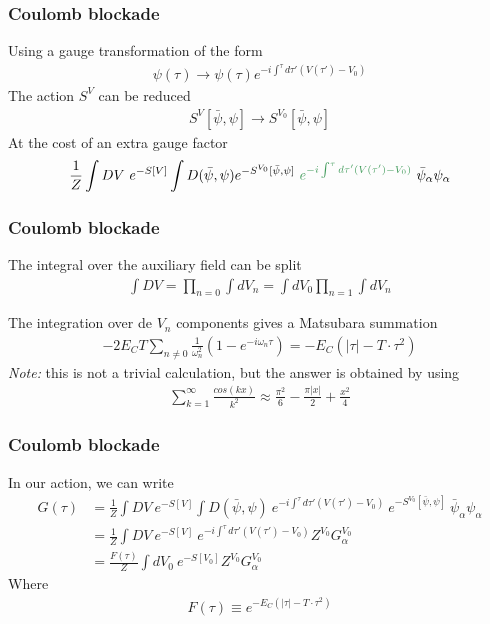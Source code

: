 \documentclass[]{beamer}
\begin{document}
\begin{frame}[t]\frametitle{Coulomb blockade}

  Using a gauge transformation of the form
  \begin{align*}
    \psi(\tau) \to \psi(\tau) e^{-i \int^{\tau} d\tau' (V(\tau') - V_0)}
  \end{align*}
  The action $S^V$ can be reduced
  \begin{align*}
    S^V[\bar{\psi}, \psi] \to S^{V_0}[\bar{\psi}, \psi]
  \end{align*}
  At the cost of an extra gauge factor
  \begin{align*}
    \frac{1}{Z} \int DV ~ e^{-S[V]} \int D(\bar{\psi}, \psi) e^{-S^{V_0}[\bar{\psi}, \psi]} ~ \textcolor{green}{e^{-i \int^{\tau} d\tau' (V(\tau') - V_0)}} ~ \bar{\psi}_{\alpha} \psi_{\alpha}
  \end{align*}

\end{frame}

\begin{frame}[t]\frametitle{Coulomb blockade}
  The integral over the auxiliary field can be split
  \begin{align*}
    \int DV = \prod_{n=0} \int dV_n = \int dV_0 \prod_{n=1} \int dV_n
  \end{align*}

  The integration over de $V_n$ components gives a Matsubara summation
  \begin{align*}
    -2 E_C T \sum_{n \not= 0} \frac{1}{\omega_n^2} (1 - e^{-i \omega_n \tau})
    = - E_C (|\tau| - T \cdot \tau^2)
  \end{align*}
  \emph{Note:} this is not a trivial calculation, but the answer is obtained by using
  \begin{align*}
    \sum_{k=1}^{\infty} \frac{cos(k x)}{k^2} \approx \frac{\pi^2}{6} - \frac{\pi |x|}{2} + \frac{x^2}{4}
  \end{align*}
\end{frame}

\begin{frame}[t]\frametitle{Coulomb blockade}
  In our action, we can write
  \begin{align*}
    G(\tau) &= \frac{1}{Z} \int DV ~ e^{-S[V]} \int D(\bar{\psi}, \psi) ~ e^{-i \int^{\tau} d\tau' (V(\tau') - V_0)} ~ e^{-S^{V_0}[\bar{\psi}, \psi]} ~ \bar{\psi}_{\alpha} \psi_{\alpha}\\
    &= \frac{1}{Z} \int DV ~ e^{-S[V]}  ~ e^{-i \int^{\tau} d\tau' (V(\tau') - V_0)} Z^{V_0} G_{\alpha}^{V_0}\\
    &= \frac{F(\tau)}{Z} \int dV_0 ~ e^{-S[V_0]} Z^{V_0} G_{\alpha}^{V_0}
  \end{align*}
  Where
  \begin{align*}
    F(\tau) \equiv e^{- E_C (|\tau| - T \cdot \tau^2)}
  \end{align*}
\end{frame}
\end{document}
